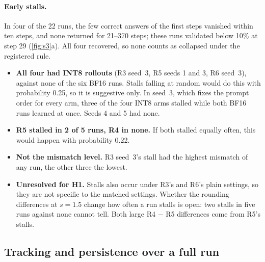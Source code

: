 \paragraph{Early stalls.} In four of the 22 runs, the few correct answers of the first steps vanished within ten steps, and none returned for 21--370 steps; these runs validated below 10\% at step 29 (\cref{fig:s3}a). All four recovered, so none counts as collapsed under the registered rule.
\begin{itemize}[leftmargin=*,itemsep=1pt]
\item \textbf{All four had INT8 rollouts} (R3 seed~3, R5 seeds 1 and 3, R6 seed~3), against none of the six BF16 runs. Stalls falling at random would do this with probability 0.25, so it is suggestive only. In seed~3, which fixes the prompt order for every arm, three of the four INT8 arms stalled while both BF16 runs learned at once. Seeds 4 and 5 had none.
\item \textbf{R5 stalled in 2 of 5 runs, R4 in none.} If both stalled equally often, this would happen with probability 0.22.
\item \textbf{Not the mismatch level.} R3 seed~3's stall had the highest mismatch of any run, the other three the lowest.
\item \textbf{Unresolved for H1.} Stalls also occur under R3's and R6's plain settings, so they are not specific to the matched settings. Whether the rounding differences at $s=1.5$ change how often a run stalls is open: two stalls in five runs against none cannot tell. Both large R4 $-$ R5 differences come from R5's stalls.
\end{itemize}

\subsection{Tracking and persistence over a full run}\label{sec:e2}

